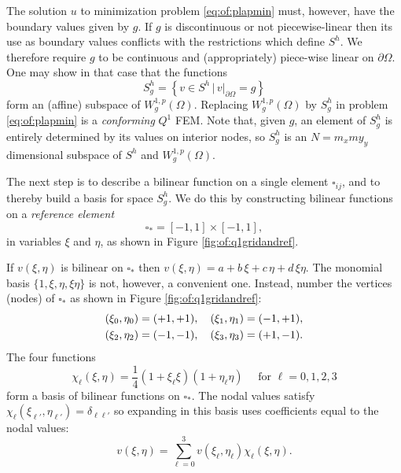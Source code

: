 The solution $u$ to minimization problem \eqref{eq:of:plapmin} must, however, have the boundary values given by $g$.  If $g$ is discontinuous or not piecewise-linear then its use as boundary values conflicts with the restrictions which define $S^h$.  We therefore require $g$ to be continuous and (appropriately) piece-wise linear on $\partial\Omega$.  One may show in that case that the functions
\begin{equation}
S_g^h = \left\{v \in S^h \, \Big| \, v|_{\partial \Omega} = g\right\} \label{eq:of:Sghdefn}
\end{equation}
form an (affine) subspace of $W_g^{1,p}(\Omega)$.  Replacing $W_g^{1,p}(\Omega)$ by $S_g^h$ in problem \eqref{eq:of:plapmin} is a \emph{conforming} $Q^1$ FEM.  Note that, given $g$, an element of $S_g^h$ is entirely determined by its values on interior nodes, so $S_g^h$ is an $N=m_x my_y$ dimensional subspace of $S^h$ and $W_g^{1,p}(\Omega)$.

The next step is to describe a bilinear function on a single element $\square_{ij}$, and to thereby build a basis for space $S_g^h$.  We do this by constructing bilinear functions on a \emph{reference element}
    $$\square_\ast = [-1,1]\times[-1,1],$$
in variables $\xi$ and $\eta$, as shown in Figure \ref{fig:of:q1gridandref}.

If $v(\xi,\eta)$ is bilinear on $\square_\ast$ then $v(\xi,\eta) = a + b\, \xi + c\, \eta + d\, \xi \eta$.  The monomial basis $\{1,\xi,\eta,\xi\eta\}$ is not, however, a convenient one.  Instead, number the vertices (nodes) of $\square_\ast$ as shown in Figure \ref{fig:of:q1gridandref}:
\begin{align}
(\xi_0,\eta_0) &= (+1,+1), \quad (\xi_1,\eta_1) = (-1,+1),    \label{eq:of:refcorners} \\
(\xi_2,\eta_2) &= (-1,-1), \quad (\xi_3,\eta_3) = (+1,-1). \notag
\end{align}
The four functions
\begin{equation}
\chi_\ell(\xi,\eta) = \frac{1}{4} \left(1 + \xi_\ell \xi\right) \left(1 + \eta_\ell \eta\right)  \quad \text{ for } \ell=0,1,2,3 \label{eq:of:chidefn}
\end{equation}
form a basis of bilinear functions on $\square_\ast$.  The nodal values satisfy $\chi_\ell(\xi_{\ell'},\eta_{\ell'}) = \delta_{\ell\ell'}$ so expanding in this basis uses coefficients equal to the nodal values:
\begin{equation}
v(\xi,\eta) = \sum_{\ell=0}^3 v(\xi_\ell,\eta_\ell) \chi_\ell(\xi,\eta). \label{eq:of:bilinearrepresentationref}
\end{equation}

